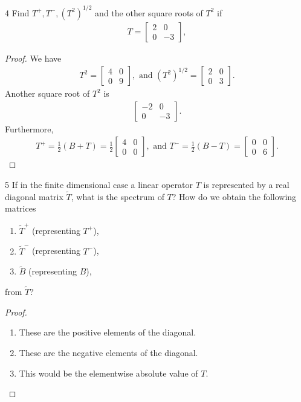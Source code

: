 \begin{exercise}{4}
Find $T^+, T^-, (T^2)^{1/2}$ and the other square roots of $T^2$ if
\begin{align*}
    T = \begin{bmatrix}
        2 & 0  \\
        0 & -3
    \end{bmatrix},
\end{align*}
\end{exercise}
\begin{proof}
We have
\begin{align*}
    T^2 = \begin{bmatrix}
        4 & 0  \\
        0 & 9
    \end{bmatrix},
    \text{ and }
    (T^2)^{1/2} = \begin{bmatrix}
        2 & 0  \\
        0 & 3
    \end{bmatrix}.
\end{align*}
Another square root of $T^2$ is
\begin{align*}
    \begin{bmatrix}
        -2 & 0  \\
        0 & -3
    \end{bmatrix}.
\end{align*}
Furthermore,
\begin{align*}
    T^+ 
    = \frac{1}{2} (B + T)
    = \frac{1}{2}
    \begin{bmatrix}
        4 & 0  \\
        0 & 0
    \end{bmatrix},
    \text{ and }
    T^- 
    = \frac{1}{2} (B - T)
    = \begin{bmatrix}
        0 & 0  \\
        0 & 6
    \end{bmatrix}.
\end{align*}
\end{proof} 

\begin{exercise}{5}
If in the finite dimensional case a linear operator $T$ is represented by a real diagonal matrix $\tilde{T}$, what is the spectrum of $T$?
How do we obtain the following matrices
\begin{enumerate}
    \item $\tilde{T}^+$ (representing $T^+$),
    \item $\tilde{T}^-$ (representing $T^-$),
    \item $\tilde{B}$ (representing $B$),
\end{enumerate}
from $\tilde{T}$?
\end{exercise}
\begin{proof}
\begin{enumerate}
    \item These are the positive elements of the diagonal.
    \item These are the negative elements of the diagonal.
    \item This would be the elementwise absolute value of $T$.
\end{enumerate}
\end{proof} 

